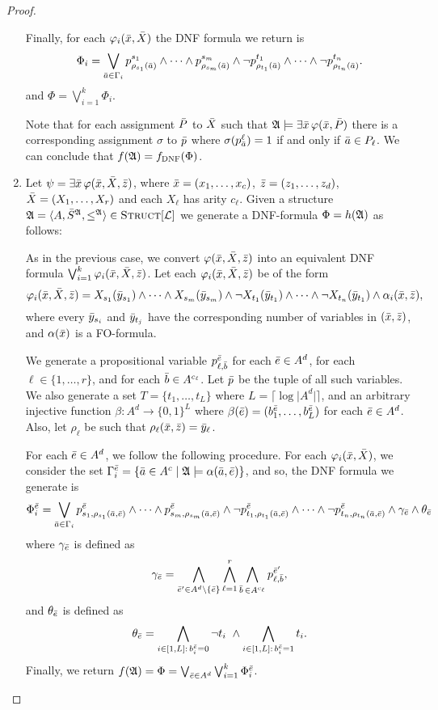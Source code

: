 \begin{proof}
\begin{enumerate}
		Finally, for each $\varphi_i(\x,\X)$ the DNF formula we return is
		\[
		\Phi_i = \bigvee_{\a\in\Gamma_i} p^{s_1}_{\rho_{s_1}(\a)} \wedge \cdots \wedge p^{s_m}_{\rho_{s_m}(\a)} \wedge \neg p^{t_1}_{\rho_{t_1}(\a)} \wedge \cdots \wedge \neg p^{t_n}_{\rho_{t_n}(\a)}.
		\]
		and $\Phi = \bigvee_{i = 1}^k \Phi_i$.
		
		Note that for each assignment $\P$ to $\X$ such that $\A\models\exists\x\,\varphi(\x,\P)$ there is a corresponding assignment $\sigma$ to $\p$ where $\sigma(p^{\ell}_{\a}) = 1$ if and only if $\a\in P_{\ell}$. We can conclude that $f(\A) = f_{\textsc{DNF}}(\Phi)$.
		
		\item Let $\psi = \exists \x\,\varphi(\x,\X,\z)$, where $\x = (x_1,\ldots,x_c)$, $\z = (z_1,\ldots,z_d)$, $\X = (X_1,\ldots,X_r)$ and each $X_{\ell}$ has arity $c_{\ell}$. Given a structure $\A = \langle A, \S^{\A}, \leq^{\A} \rangle\in\Truc$ we generate a DNF-formula $\Phi = h(\A)$ as follows:
		
		As in the previous case, we convert $\varphi(\x,\X,\z)$ into an equivalent DNF formula $\bigvee_{i = 1}^k \varphi_{i}(\x,\X,\z)$. Let each $\varphi_{i}(\x,\X,\z)$ be of the form
		\[
		\varphi_{i}(\x,\X,\z) = X_{s_1}(\y_{s_1}) \wedge \cdots \wedge X_{s_m}(\y_{s_m}) \wedge \neg X_{t_1}(\y_{t_1}) \wedge \cdots \wedge \neg X_{t_n}(\y_{t_1}) \wedge \alpha_i(\x,\z),
		\]
		where every $\y_{s_i}$ and $\y_{t_j}$ have the corresponding number of variables in $(\x,\z)$, and $\alpha(\x)$ is a FO-formula.
		
		We generate a propositional variable $p^{\e}_{\ell,\b}$ for each $\e\in A^d$, for each $\ell\in\{1,\ldots,r\}$, and for each $\b\in A^{c_{\ell}}$. Let $\p$ be the tuple of all such variables. We also generate a set $T = \{t_1,\ldots,t_{L}\}$ where $L = \lceil \log\vert A^d\vert \rceil$, and an arbitrary injective function $\beta:A^d \to \{0,1\}^L$ where $\beta(\e) = (b^{\e}_1,\ldots,b^{\e}_L)$ for each $\e\in A^d$. Also, let $\rho_{\ell}$ be such that $\rho_{\ell}(\x,\z) = \y_{\ell}$.
		
		For each $\e\in A^d$, we follow the following procedure. For each $\varphi_i(\x,\X)$, we consider the set $\Gamma^{\e}_i = \{\a\in A^c\mid \A\models\alpha(\a,\e)\}$, and so, the DNF formula we generate is
		\[
		\Phi^{\e}_i = \bigvee_{\a\in\Gamma_i} p^{\e}_{s_1,\rho_{s_1}(\a,\e)} \wedge \cdots \wedge p^{\e}_{s_m,\rho_{s_m}(\a,\e)} \wedge \neg p^{\e}_{t_1,\rho_{t_1}(\a,\e)} \wedge \cdots \wedge \neg p^{\e}_{t_n,\rho_{t_n}(\a,\e)} \wedge \gamma_{\e} \wedge \theta_{\e}
		\]
		where $\gamma_{\e}$ is defined as
		\[
			\gamma_{\e} = \bigwedge_{\e'\in A^d\setminus\{\e\}} \bigwedge_{\ell = 1}^r \bigwedge_{\b\,\in A^{c_{\ell}}} p_{\ell,\b}^{\e'},
		\]
		and $\theta_{\e}$ is defined as
		\[
			\theta_{\e} = \bigwedge_{i\in[1,L]:\,b^{\e}_i = 0} \neg t_i\  \wedge \bigwedge_{i\in[1,L]:\,b^{\e}_i = 1} t_i.
		\]
		Finally, we return $f(\A) = \Phi = \bigvee_{\e\in A^d} \bigvee_{i = 1}^k \Phi_i^{\e}$. 
		

\end{enumerate}
\end{proof}

